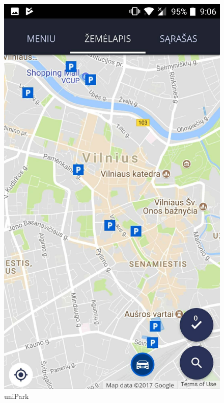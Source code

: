 \documentclass{VUMIFPSkursinis}
\begin{document}
\begin{enumerate}
\begin{samepage}
			\begin{figure}[H]
				\centering
				\includegraphics[scale=0.3]{img/unipark}
				\caption{uniPark}
				\label{img:unipark}
			\end{figure}
		\end{samepage}
\end{enumerate}
\end{document}
